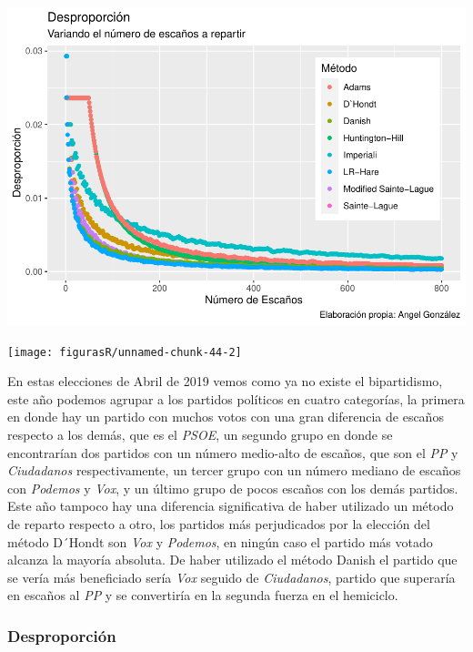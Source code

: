 \documentclass[12pt,a4paper,]{book}
\numberwithin{dummy}{section}
\theoremstyle{ocrenumbox}
\theoremstyle{blacknumex}
\theoremstyle{blacknumbox}
\theoremstyle{ocrenum}
\theoremstyle{ocrenum}
\begin{document}
\begin{center}\includegraphics[width=1\linewidth]{figurasR/unnamed-chunk-44-1} \end{center}

\begin{center}\texttt{[image: figurasR/unnamed-chunk-44-2]} \end{center}

En estas elecciones de Abril de 2019 vemos como ya no existe el
bipartidismo, este año podemos agrupar a los partidos políticos en
cuatro categorías, la primera en donde hay un partido con muchos votos
con una gran diferencia de escaños respecto a los demás, que es el
\emph{PSOE}, un segundo grupo en donde se encontrarían dos partidos con
un número medio-alto de escaños, que son el \emph{PP} y
\emph{Ciudadanos} respectivamente, un tercer grupo con un número mediano
de escaños con \emph{Podemos} y \emph{Vox}, y un último grupo de pocos
escaños con los demás partidos. Este año tampoco hay una diferencia
significativa de haber utilizado un método de reparto respecto a otro,
los partidos más perjudicados por la elección del método D´Hondt son
\emph{Vox} y \emph{Podemos}, en ningún caso el partido más votado
alcanza la mayoría absoluta. De haber utilizado el método Danish el
partido que se vería más beneficiado sería \emph{Vox} seguido de
\emph{Ciudadanos}, partido que superaría en escaños al \emph{PP} y se
convertiría en la segunda fuerza en el hemiciclo.

\hypertarget{desproporciuxf3n-13}{%
\subsubsection{Desproporción}\label{desproporciuxf3n-13}}
\end{document}

